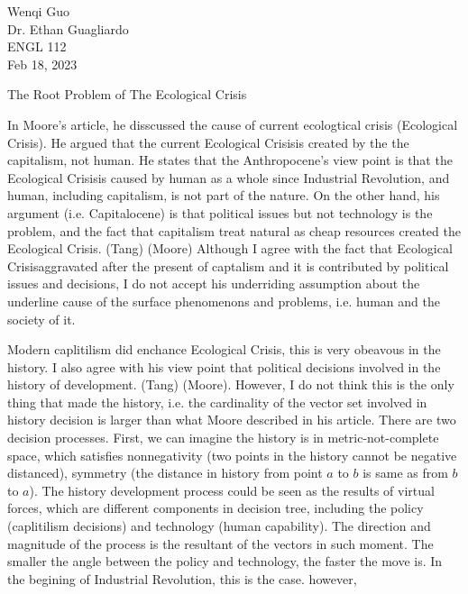 \documentclass[12pt]{article}
\newcommand{\IR}{Industrial Revolution}
\newcommand{\EC}{Ecological Crisis}
\begin{document}
\begin{flushleft}

Wenqi Guo\\
Dr. Ethan Guagliardo\\
ENGL 112\\
Feb 18, 2023\\

\begin{center}
The Root Problem of The Ecological Crisis
\end{center}



\setlength{\parindent}{0.5in}


In Moore's article, he disscussed the cause of current ecologtical crisis (\EC). He argued that the current \EC is created by the the capitalism, not human. He states that the Anthropocene’s view point is that the \EC is caused by human as a whole since Industrial Revolution, and human, including capitalism, is not part of the nature. On the other hand, his argument (i.e. Capitalocene) is that political issues but not technology is the problem, and the fact that capitalism treat natural as cheap resources created the \EC. (Tang) (Moore)
Although I agree with the fact that \EC aggravated after the present of captalism and it is contributed by political issues and decisions, I do not accept his underriding assumption about the underline cause of the surface phenomenons and problems, i.e. human and the society of it.

Modern caplitilism did enchance \EC, this is very obeavous in the history. I also agree with his view point that political decisions involved in the history of development. (Tang) (Moore). However, I do not think this is the only thing that made the history, i.e. the cardinality of the vector set involved in history decision is larger than what Moore described in his article. There are two decision processes. First, we can imagine the history is in metric-not-complete space, which satisfies nonnegativity (two points in the history cannot be negative distanced), symmetry (the distance in history from point $a$ to $b$ is same as from $b$ to $a$).
The history development process could be seen as the results of virtual forces, which are different components in decision tree, including the policy (caplitilism decisions) and technology (human capability). The direction and magnitude of the process is the resultant of the vectors in such moment. The smaller the angle between the policy and technology, the faster the move is. In the begining of \IR, this is the case. however, 


\end{flushleft}
\end{document}
